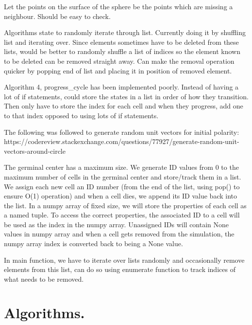 \documentclass[english]{article}
\begin{document}
Let the points on the surface of the sphere be the points which are missing a neighbour. Should be easy to check.

Algorithms state to randomly iterate through list. Currently doing it by shuffling list and iterating over. Since elements sometimes have to be deleted from these lists, would be better to randomly shuffle a list of indices so the element known to be deleted can be removed straight away. Can make the removal operation quicker by popping end of list and placing it in position of removed element. 

Algorithm 4, progress\_cycle has been implemented poorly. Instead of having a lot of if statements, could store the states in a list in order of how they transition. Then only have to store the index for each cell and when they progress, add one to that index opposed to using lots of if statements. 

The following was followed to generate random unit vectors for initial polarity: https://codereview.stackexchange.com/questions/77927/generate-random-unit-vectors-around-circle

The germinal center has a maximum size. We generate ID values from 0 to the maximum number of cells in the germinal center and store/track them in a list. We assign each new cell an ID number (from the end of the list, using pop() to ensure O(1) operation) and when a cell dies, we append its ID value back into the list. In a numpy array of fixed size, we will store the properties of each cell as a named tuple. To access the correct properties, the associated ID to a cell will be used as the index in the numpy array. Unassigned IDs will contain None values in numpy array and when a cell gets removed from the simulation, the numpy array index is converted back to being a None value. 

In main function, we have to iterate over lists randomly and occasionally remove elements from this list, can do so using enumerate function to track indices of what needs to be removed. 	



\section{Algorithms.}
\end{document}
